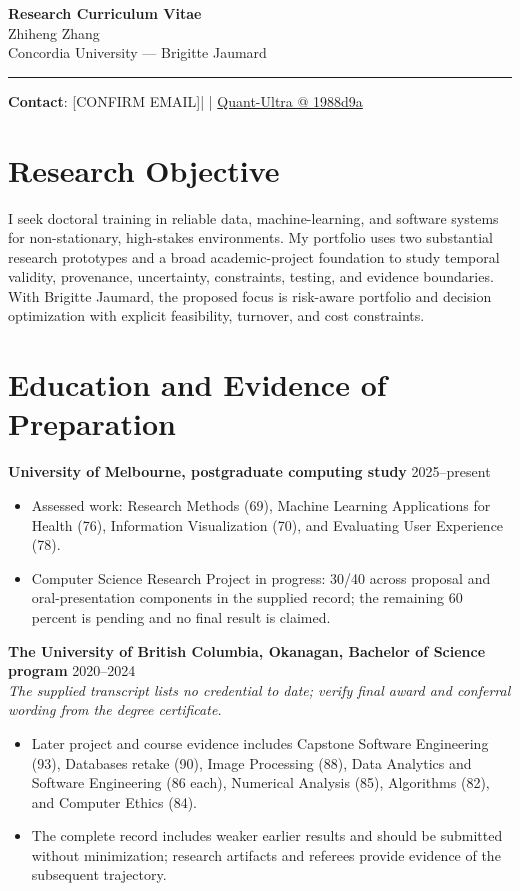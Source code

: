 \documentclass[11pt]{article}
\makeatletter
\newcommand{\ApplicantName}{Zhiheng Zhang}
\newcommand{\ApplicantEmail}{[CONFIRM EMAIL]}
\newcommand{\ApplicantPhone}{[CONFIRM PHONE]}
\newcommand{\ApplicantGitHub}{\href{https://github.com/zhiheng-zhang-Mera/Quant-Ultra/tree/1988d9a8530da91a8158de864d098ea869098923}{Quant-Ultra @ 1988d9a}}
\makeatother
\begin{document}
\begin{center}
{\LARGE\bfseries Research Curriculum Vitae}\\[0.25em]
{\large \ApplicantName}\\
Concordia University --- Brigitte Jaumard
\end{center}
\vspace{0.35em}\hrule\vspace{0.65em}

\textbf{Contact}: \ApplicantEmail\quad | \quad \ApplicantPhone\quad | \quad \ApplicantGitHub

\section*{Research Objective}
I seek doctoral training in reliable data, machine-learning, and software systems for non-stationary, high-stakes environments. My portfolio uses two substantial research prototypes and a broad academic-project foundation to study temporal validity, provenance, uncertainty, constraints, testing, and evidence boundaries. With Brigitte Jaumard, the proposed focus is risk-aware portfolio and decision optimization with explicit feasibility, turnover, and cost constraints.

\section*{Education and Evidence of Preparation}
\textbf{University of Melbourne, postgraduate computing study} \hfill 2025--present
\begin{itemize}
\item Assessed work: Research Methods (69), Machine Learning Applications for Health (76), Information Visualization (70), and Evaluating User Experience (78).
\item Computer Science Research Project in progress: 30/40 across proposal and oral-presentation components in the supplied record; the remaining 60 percent is pending and no final result is claimed.
\end{itemize}

\textbf{The University of British Columbia, Okanagan, Bachelor of Science program} \hfill 2020--2024\\
\textit{The supplied transcript lists no credential to date; verify final award and conferral wording from the degree certificate.}
\begin{itemize}
\item Later project and course evidence includes Capstone Software Engineering (93), Databases retake (90), Image Processing (88), Data Analytics and Software Engineering (86 each), Numerical Analysis (85), Algorithms (82), and Computer Ethics (84).
\item The complete record includes weaker earlier results and should be submitted without minimization; research artifacts and referees provide evidence of the subsequent trajectory.
\end{itemize}
\end{document}
